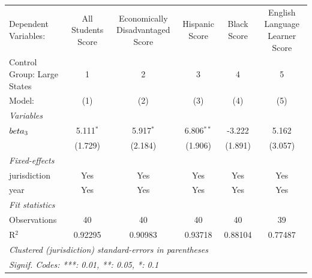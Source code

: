 
\begingroup
\centering
\begin{tabular}{lccccc}
   \tabularnewline \midrule \midrule
   Dependent Variables:        & All Students Score & Economically Disadvantaged Score & Hispanic Score & Black Score & English Language Learner Score\\  
   Control Group: Large States & 1                  & 2                                & 3              & 4           & 5 \\   
   Model:                      & (1)                & (2)                              & (3)            & (4)         & (5)\\  
   \midrule
   \emph{Variables}\\
   $\\beta_3$                  & 5.111$^{*}$        & 5.917$^{*}$                      & 6.806$^{**}$   & -3.222      & 5.162\\   
                               & (1.729)            & (2.184)                          & (1.906)        & (1.891)     & (3.057)\\   
   \midrule
   \emph{Fixed-effects}\\
   jurisdiction                & Yes                & Yes                              & Yes            & Yes         & Yes\\  
   year                        & Yes                & Yes                              & Yes            & Yes         & Yes\\  
   \midrule
   \emph{Fit statistics}\\
   Observations                & 40                 & 40                               & 40             & 40          & 39\\  
   R$^2$                       & 0.92295            & 0.90983                          & 0.93718        & 0.88104     & 0.77487\\  
   \midrule \midrule
   \multicolumn{6}{l}{\emph{Clustered (jurisdiction) standard-errors in parentheses}}\\
   \multicolumn{6}{l}{\emph{Signif. Codes: ***: 0.01, **: 0.05, *: 0.1}}\\
\end{tabular}
\par\endgroup


